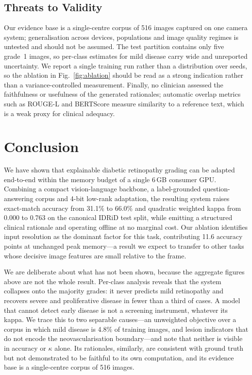 \documentclass[conference]{IEEEtran}
\begin{document}
\subsection{Threats to Validity}
Our evidence base is a single-centre corpus of 516 images captured on one camera
system; generalisation across devices, populations and image quality regimes is
untested and should not be assumed. The test partition contains only five
grade~1 images, so per-class estimates for mild disease carry wide and unreported
uncertainty. We report a single training run rather than a distribution over
seeds, so the ablation in Fig.~\ref{fig:ablation} should be read as a strong
indication rather than a variance-controlled measurement. Finally, no clinician
assessed the faithfulness or usefulness of the generated rationales; automatic
overlap metrics such as ROUGE-L and BERTScore measure similarity to a reference
text, which is a weak proxy for clinical adequacy.

\section{Conclusion}

We have shown that explainable diabetic retinopathy grading can be adapted
end-to-end within the memory budget of a single 6\,GB consumer GPU. Combining a
compact vision-language backbone, a label-grounded question-answering corpus and
4-bit low-rank adaptation, the resulting system raises exact-match accuracy from
31.1\% to 66.0\% and quadratic weighted kappa from 0.000 to 0.763 on the
canonical IDRiD test split, while emitting a structured clinical rationale and
operating offline at no marginal cost. Our ablation identifies input resolution
as the dominant factor for this task, contributing 11.6 accuracy points at
unchanged peak memory---a result we expect to transfer to other tasks whose
decisive image features are small relative to the frame.

We are deliberate about what has not been shown, because the aggregate figures
above are not the whole result. Per-class analysis reveals that the system
collapses onto the majority grades: it never predicts mild retinopathy and
recovers severe and proliferative disease in fewer than a third of cases. A model
that cannot detect early disease is not a screening instrument, whatever its
kappa. We trace this to two separable causes---an unweighted objective over a
corpus in which mild disease is 4.8\% of training images, and lesion indicators
that do not encode the neovascularisation boundary---and note that neither is
visible in accuracy or $\kappa$ alone. Its rationales, similarly, are consistent
with ground truth but not demonstrated to be faithful to its own computation, and
its evidence base is a single-centre corpus of 516 images.
\end{document}
